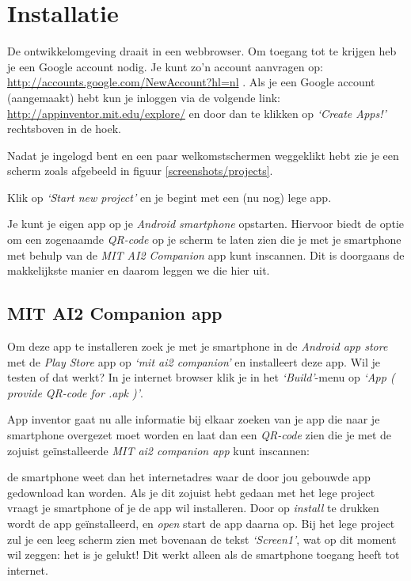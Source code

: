 \chapter{Installatie}

De \ai ontwikkelomgeving draait in een webbrowser. Om toegang tot \ai te krijgen heb je een Google account nodig. Je kunt zo'n account aanvragen op: \url{http://accounts.google.com/NewAccount?hl=nl} . Als je een Google account (aangemaakt) hebt kun je inloggen via de volgende link: \url{http://appinventor.mit.edu/explore/} en door dan te klikken op \emph{`Create Apps!'} rechtsboven in de hoek.


Nadat je ingelogd bent en een paar welkomstschermen weggeklikt hebt zie je een scherm zoals afgebeeld in figuur \ref{screenshots/projects}.


Klik op \emph{`Start new project'} en je begint met een (nu nog) lege app. 

Je kunt je eigen app op je \emph{Android smartphone} opstarten. Hiervoor biedt \ai de optie om een zogenaamde \emph{QR-code} op je scherm te laten zien die je met je smartphone met behulp van de \emph{MIT AI2 Companion} app kunt inscannen. Dit is doorgaans de makkelijkste manier en daarom leggen we die hier uit. 

\section{MIT AI2 Companion app}
Om deze app te installeren zoek je met je smartphone in de \emph{Android app store} met de \emph{Play Store} app op \emph{`mit ai2 companion'} en installeert deze app. Wil je testen of dat werkt? In je internet browser klik je in het \emph{`Build'}-menu op \emph{`App ( provide QR-code for .apk )'}.
 

App inventor gaat nu alle informatie bij elkaar zoeken van je app die naar je smartphone overgezet moet worden en laat dan een \emph{QR-code} zien die je met de zojuist ge\"installeerde \emph{MIT ai2 companion app} kunt inscannen: 


de smartphone weet dan het internetadres waar de door jou gebouwde app gedownload kan worden. Als je dit zojuist hebt gedaan met het lege project vraagt je smartphone of je de app wil installeren. Door op \emph{install} te drukken wordt de app ge\"installeerd, en \emph{open} start de app daarna op. Bij het lege project zul je een leeg scherm zien met bovenaan de tekst \emph{`Screen1'}, wat op dit moment wil zeggen: het is je gelukt! Dit werkt alleen als de smartphone toegang heeft tot internet. 

